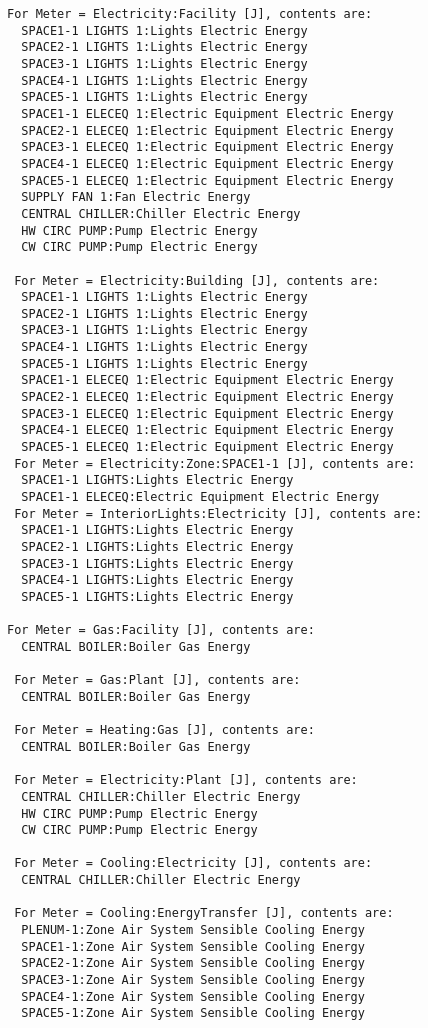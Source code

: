 \begin{lstlisting}
For Meter = Electricity:Facility [J], contents are:
  SPACE1-1 LIGHTS 1:Lights Electric Energy
  SPACE2-1 LIGHTS 1:Lights Electric Energy
  SPACE3-1 LIGHTS 1:Lights Electric Energy
  SPACE4-1 LIGHTS 1:Lights Electric Energy
  SPACE5-1 LIGHTS 1:Lights Electric Energy
  SPACE1-1 ELECEQ 1:Electric Equipment Electric Energy
  SPACE2-1 ELECEQ 1:Electric Equipment Electric Energy
  SPACE3-1 ELECEQ 1:Electric Equipment Electric Energy
  SPACE4-1 ELECEQ 1:Electric Equipment Electric Energy
  SPACE5-1 ELECEQ 1:Electric Equipment Electric Energy
  SUPPLY FAN 1:Fan Electric Energy
  CENTRAL CHILLER:Chiller Electric Energy
  HW CIRC PUMP:Pump Electric Energy
  CW CIRC PUMP:Pump Electric Energy

 For Meter = Electricity:Building [J], contents are:
  SPACE1-1 LIGHTS 1:Lights Electric Energy
  SPACE2-1 LIGHTS 1:Lights Electric Energy
  SPACE3-1 LIGHTS 1:Lights Electric Energy
  SPACE4-1 LIGHTS 1:Lights Electric Energy
  SPACE5-1 LIGHTS 1:Lights Electric Energy
  SPACE1-1 ELECEQ 1:Electric Equipment Electric Energy
  SPACE2-1 ELECEQ 1:Electric Equipment Electric Energy
  SPACE3-1 ELECEQ 1:Electric Equipment Electric Energy
  SPACE4-1 ELECEQ 1:Electric Equipment Electric Energy
  SPACE5-1 ELECEQ 1:Electric Equipment Electric Energy
 For Meter = Electricity:Zone:SPACE1-1 [J], contents are:
  SPACE1-1 LIGHTS:Lights Electric Energy
  SPACE1-1 ELECEQ:Electric Equipment Electric Energy
 For Meter = InteriorLights:Electricity [J], contents are:
  SPACE1-1 LIGHTS:Lights Electric Energy
  SPACE2-1 LIGHTS:Lights Electric Energy
  SPACE3-1 LIGHTS:Lights Electric Energy
  SPACE4-1 LIGHTS:Lights Electric Energy
  SPACE5-1 LIGHTS:Lights Electric Energy

For Meter = Gas:Facility [J], contents are:
  CENTRAL BOILER:Boiler Gas Energy

 For Meter = Gas:Plant [J], contents are:
  CENTRAL BOILER:Boiler Gas Energy

 For Meter = Heating:Gas [J], contents are:
  CENTRAL BOILER:Boiler Gas Energy

 For Meter = Electricity:Plant [J], contents are:
  CENTRAL CHILLER:Chiller Electric Energy
  HW CIRC PUMP:Pump Electric Energy
  CW CIRC PUMP:Pump Electric Energy

 For Meter = Cooling:Electricity [J], contents are:
  CENTRAL CHILLER:Chiller Electric Energy

 For Meter = Cooling:EnergyTransfer [J], contents are:
  PLENUM-1:Zone Air System Sensible Cooling Energy
  SPACE1-1:Zone Air System Sensible Cooling Energy
  SPACE2-1:Zone Air System Sensible Cooling Energy
  SPACE3-1:Zone Air System Sensible Cooling Energy
  SPACE4-1:Zone Air System Sensible Cooling Energy
  SPACE5-1:Zone Air System Sensible Cooling Energy
\end{lstlisting}

